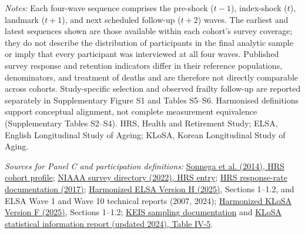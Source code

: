 \begin{table}[!htbp]
\vspace{0.25em}
\parbox{\textwidth}{\raggedright\fontsize{9}{11}\selectfont\textit{Notes:} Each four-wave sequence comprises the pre-shock ($t-1$), index-shock ($t$), landmark ($t+1$), and next scheduled follow-up ($t+2$) waves. The earliest and latest sequences shown are those available within each cohort's survey coverage; they do not describe the distribution of participants in the final analytic sample or imply that every participant was interviewed at all four waves. Published survey response and retention indicators differ in their reference populations, denominators, and treatment of deaths and are therefore not directly comparable across cohorts. Study-specific selection and observed frailty follow-up are reported separately in Supplementary Figure S1 and Tables S5--S6. Harmonised definitions support conceptual alignment, not complete measurement equivalence (Supplementary Tables S2--S4). HRS, Health and Retirement Study; ELSA, English Longitudinal Study of Ageing; KLoSA, Korean Longitudinal Study of Aging.}
\vspace{0.25em}
\parbox{\textwidth}{\raggedright\fontsize{9}{11}\selectfont\textit{Sources for Panel C and participation definitions:} \href{https://doi.org/10.1093/ije/dyu067}{Sonnega et al. (2014), HRS cohort profile}; \href{https://www.niaaa.nih.gov/research/alcohol-epidemiologic-data-directory-2022}{NIAAA survey directory (2022), HRS entry}; \href{https://hrs.isr.umich.edu/sites/default/files/biblio/ResponseRates_2017.pdf}{HRS response-rate documentation (2017)}; \href{https://doi.org/10.25553/h52b-8869}{Harmonized ELSA Version H (2025)}, Sections 1--1.2, and ELSA Wave 1 and Wave 10 technical reports (2007, 2024); \href{https://doi.org/10.25553/0gba-4r74}{Harmonized KLoSA Version F (2025)}, Sections 1--1.2; \href{https://survey.keis.or.kr/klosa/klosa03.jsp}{KEIS sampling documentation} and \href{https://www.kostat.go.kr/boardDownload.es?bid=12030&list_no=434382&seq=1}{KLoSA statistical information report (updated 2024), Table IV-5}.}
\end{table}
